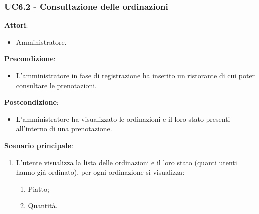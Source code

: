 \subsubsection{UC6.2 - Consultazione delle ordinazioni}\label{usecase:6_2}
\textbf{Attori}:
\begin{itemize}
    \item Amministratore.
\end{itemize}
\textbf{Precondizione}:
\begin{itemize}
    \item L'amministratore in fase di registrazione ha inserito un ristorante di cui poter consultare le prenotazioni.
\end{itemize}
\textbf{Postcondizione}:
\begin{itemize}
    \item L'amministratore ha visualizzato le ordinazioni e il loro stato presenti all'interno di una prenotazione.
\end{itemize}
\textbf{Scenario principale}:
\begin{enumerate}
    \item L'utente visualizza la lista delle ordinazioni e il loro stato (quanti utenti hanno già ordinato), per ogni ordinazione si visualizza:
    \begin{enumerate}
        \item Piatto;
        \item Quantità.
    \end{enumerate}
\end{enumerate}
\newpage